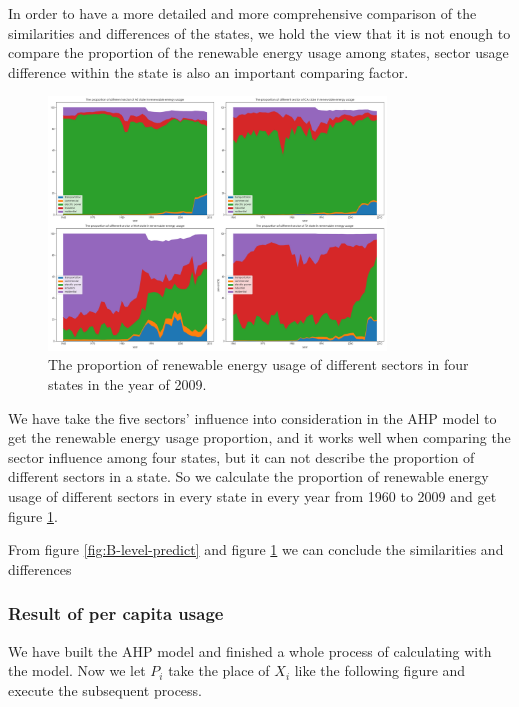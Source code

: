 \documentclass[a4paper,11pt]{article}
\begin{document}
\par In order to have a more detailed and more comprehensive comparison of the similarities and differences of the states, we hold the view that it is not  enough to compare the proportion of the renewable energy usage among states, sector usage difference within the state is also an important comparing factor.

\begin{figure}[h]%
    \centering 
    \includegraphics[width=0.8\textwidth]{./Pic/B-percent.png}
    \caption{The proportion of renewable energy usage of different sectors in four states in the year of 2009.}
    \label{fig:B-percent}  
\end{figure}

\par We have take the five sectors' influence into consideration in the AHP model to get the renewable energy usage proportion, and it works well when comparing the sector influence among four states, but it can not describe the proportion of different sectors in a state. So we calculate the proportion of renewable energy usage of different sectors in every state in every year from 1960 to 2009 and get figure \ref{fig:B-percent}.
\par From figure \ref{fig:B-level-predict} and figure \ref{fig:B-percent} we can conclude the similarities and differences


\subsubsection{Result of per capita usage}
\par We have built the AHP model and finished a whole process of calculating with the model. Now we let $P_i$ take the place of $X_i$ like the following figure and execute the subsequent process.
\end{document}
